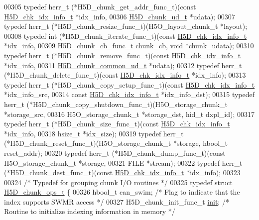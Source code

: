 \begin{DoxyCode}
00305 \textcolor{keyword}{typedef} herr\_t (*H5D\_chunk\_get\_addr\_func\_t)(\textcolor{keyword}{const} \hyperlink{struct_h5_d__chk__idx__info__t}{H5D\_chk\_idx\_info\_t} *idx\_info,
00306     \hyperlink{struct_h5_d__chunk__ud__t}{H5D\_chunk\_ud\_t} *udata);
00307 \textcolor{keyword}{typedef} herr\_t (*H5D\_chunk\_resize\_func\_t)(H5O\_layout\_chunk\_t *layout);
00308 \textcolor{keyword}{typedef} int (*H5D\_chunk\_iterate\_func\_t)(\textcolor{keyword}{const} \hyperlink{struct_h5_d__chk__idx__info__t}{H5D\_chk\_idx\_info\_t} *idx\_info,
00309     H5D\_chunk\_cb\_func\_t chunk\_cb, \textcolor{keywordtype}{void} *chunk\_udata);
00310 \textcolor{keyword}{typedef} herr\_t (*H5D\_chunk\_remove\_func\_t)(\textcolor{keyword}{const} \hyperlink{struct_h5_d__chk__idx__info__t}{H5D\_chk\_idx\_info\_t} *idx\_info,
00311     \hyperlink{struct_h5_d__chunk__common__ud__t}{H5D\_chunk\_common\_ud\_t} *udata);
00312 \textcolor{keyword}{typedef} herr\_t (*H5D\_chunk\_delete\_func\_t)(\textcolor{keyword}{const} \hyperlink{struct_h5_d__chk__idx__info__t}{H5D\_chk\_idx\_info\_t} *idx\_info);
00313 \textcolor{keyword}{typedef} herr\_t (*H5D\_chunk\_copy\_setup\_func\_t)(\textcolor{keyword}{const} \hyperlink{struct_h5_d__chk__idx__info__t}{H5D\_chk\_idx\_info\_t} *idx\_info\_src,
00314     \textcolor{keyword}{const} \hyperlink{struct_h5_d__chk__idx__info__t}{H5D\_chk\_idx\_info\_t} *idx\_info\_dst);
00315 \textcolor{keyword}{typedef} herr\_t (*H5D\_chunk\_copy\_shutdown\_func\_t)(H5O\_storage\_chunk\_t *storage\_src,
00316     H5O\_storage\_chunk\_t *storage\_dst, hid\_t dxpl\_id);
00317 \textcolor{keyword}{typedef} herr\_t (*H5D\_chunk\_size\_func\_t)(\textcolor{keyword}{const} \hyperlink{struct_h5_d__chk__idx__info__t}{H5D\_chk\_idx\_info\_t} *idx\_info,
00318     hsize\_t *idx\_size);
00319 \textcolor{keyword}{typedef} herr\_t (*H5D\_chunk\_reset\_func\_t)(H5O\_storage\_chunk\_t *storage, hbool\_t reset\_addr);
00320 \textcolor{keyword}{typedef} herr\_t (*H5D\_chunk\_dump\_func\_t)(\textcolor{keyword}{const} H5O\_storage\_chunk\_t *storage,
00321     FILE *stream);
00322 \textcolor{keyword}{typedef} herr\_t (*H5D\_chunk\_dest\_func\_t)(\textcolor{keyword}{const} \hyperlink{struct_h5_d__chk__idx__info__t}{H5D\_chk\_idx\_info\_t} *idx\_info);
00323 
00324 \textcolor{comment}{/* Typedef for grouping chunk I/O routines */}
00325 \textcolor{keyword}{typedef} \textcolor{keyword}{struct }\hyperlink{struct_h5_d__chunk__ops__t}{H5D\_chunk\_ops\_t} \{
00326     hbool\_t can\_swim;                       \textcolor{comment}{/* Flag to indicate that the index supports SWMR access */}
00327     H5D\_chunk\_init\_func\_t \hyperlink{structinit}{init};             \textcolor{comment}{/* Routine to initialize indexing information in memory */}

\end{DoxyCode}
